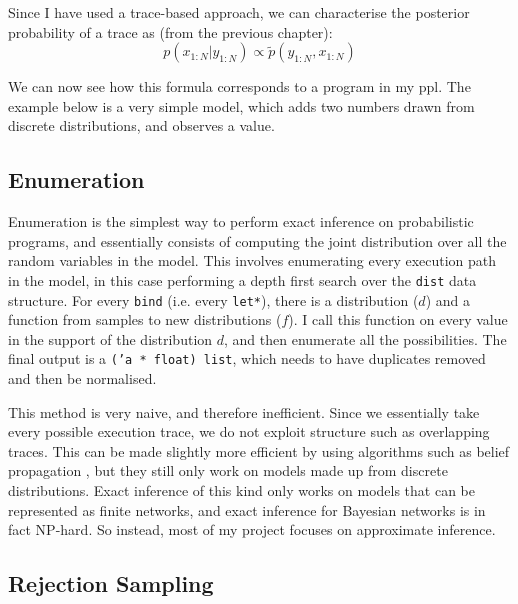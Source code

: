 Since I have used a trace-based approach, we can characterise the posterior probability of a trace as (from the previous chapter):
$$p(x_{1:N}|y_{1:N})\propto\tilde{p}(y_{1:N},x_{1:N})$$

We can now see how this formula corresponds to a program in my ppl. The example below is a very simple model, which adds two numbers drawn from discrete distributions, and observes a value.


\subsection{Enumeration} \label{sec:enum}
Enumeration is the simplest way to perform exact inference on probabilistic programs, and essentially consists of computing the joint distribution over all the random variables in the model. This involves enumerating every execution path in the model, in this case performing a depth first search over the \texttt{dist} data structure. For every \texttt{bind} (i.e. every \texttt{let*}), there is a distribution ($d$) and a function from samples to new distributions ($f$). I call this function on every value in the support of the distribution $d$, and then enumerate all the possibilities. The final output is a \texttt{('a * float) list}, which needs to have duplicates removed and then be normalised.



This method is very naive, and therefore inefficient. Since we essentially take every possible execution trace, we do not exploit structure such as overlapping traces. This can be made slightly more efficient by using algorithms such as belief propagation \cite{belief-prop}, but they still only work on models made up from discrete distributions. Exact inference of this kind only works on models that can be represented as finite networks, and exact inference for Bayesian networks is in fact NP-hard\cite{cooper1990computational}. So instead, most of my project focuses on approximate inference.

\subsection{Rejection Sampling} \label{sec:rej}
